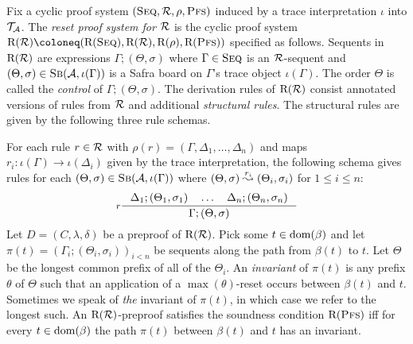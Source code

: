 \begin{definition}\label{def:acr}
  Fix a cyclic proof system $(\Seq, \RR, \rho, \SC)$ induced by a trace
  interpretation $\iota$ into $\TT_{\Aa}$. The \emph{reset proof system for
    $\RR$} is the cyclic proof system $\Rrr(\RR) \coloneq (\Rrr(\Seq), \Rrr(\RR), \Rrr(\rho), \Rrr(\SC))$ specified as follows.
    Sequents in \( \Rrr(\RR) \) are expressions \( \Gamma ; (\Theta, \sigma) \)
    where \( \Gamma \in \Seq \) is an \( \RR \)-sequent and $ (\Theta, \sigma)
    \in \Sb(\Aa, \iota(\Gamma))$ is a Safra board on $\Gamma$'s trace object $\iota(\Gamma)$.
  The order \( \Theta \) is called the \emph{control} of $\Gamma ; (\Theta, \sigma)$. The
  derivation rules of $\Rrr(\RR)$ consist annotated versions of rules from \( \RR \) and additional \emph{structural rules}. The structural rules are given by the following three rule schemas.
  \begin{mathpar}


  \end{mathpar}
  For each rule $r \in \RR$ with $\rho(r) = (\Gamma, \Delta_1, \ldots, \Delta_n)$
  and maps $r_i \colon \iota(\Gamma) \to \iota(\Delta_i)$ given by the trace interpretation, the
  following schema gives rules for each $(\Theta, \sigma) \in \Sb(\Aa,
  \iota(\Gamma))$ where $(\Theta, \sigma) \step{r_i} (\Theta_i, \sigma_i)$ for
  $1 \leq i \leq n$:
  \[
    \inference[$r$]{
      \Delta_1 ; (\Theta_1, \sigma_1) \quad
      \ldots \quad
      \Delta_n ; (\Theta_n, \sigma_n)
    }
    {\Gamma ; (\Theta, \sigma)}
  \]
  Let $D = (C, \lambda, \delta)$ be a preproof of $\Rrr(\RR)$.
  Pick some $t \in \dom(\beta)$ and let $\pi(t) = (\Gamma_i ; (\Theta_i, \sigma_i))_{i < n}$
  be sequents along the path from $\beta(t)$ to $t$. Let $\Theta$ be the longest common prefix
  of all of the $\Theta_i$. An \emph{invariant} of $\pi(t)$ is any prefix $\theta$
  of $\Theta$ such that an application of a $\max(\theta)$-reset occurs between
  $\beta(t)$ and $t$. Sometimes we
  speak of \emph{the} invariant of $\pi(t)$, in which case we refer to the longest
  such. 
  An $\Rrr(\RR)$-preproof satisfies the soundness condition $\Rrr(\SC)$ iff for every $t \in
  \dom(\beta)$ the path $\pi(t)$ between $\beta(t)$ and $t$ has an invariant.
\end{definition}

